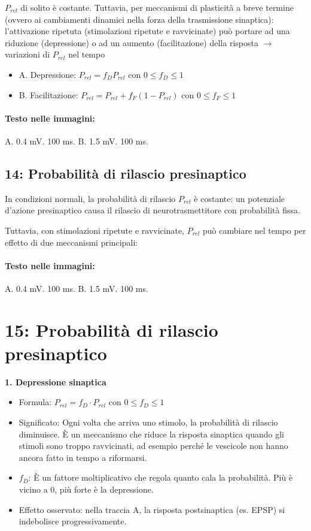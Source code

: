 $P_{rel}$ di solito è costante. Tuttavia, per meccanismi di plasticità a breve termine (ovvero ai cambiamenti dinamici nella forza della trasmissione sinaptica): l'attivazione ripetuta (stimolazioni ripetute e ravvicinate) può portare ad una riduzione (depressione) o ad un aumento (facilitazione) della risposta $\rightarrow$ variazioni di $P_{rel}$ nel tempo

\begin{itemize}
    \item A. Depressione: $P_{rel} = f_{D} P_{rel}$ con $0 \le f_{D} \le 1$
    \item B. Facilitazione: $P_{rel} = P_{rel} + f_{F}(1 - P_{rel})$ con $0 \le f_{F} \le 1$
\end{itemize}

\paragraph*{Testo nelle immagini:}
A. 0.4 mV. 100 ms. B. 1.5 mV. 100 ms.


\subsection*{ 14: Probabilità di rilascio presinaptico}

In condizioni normali, la probabilità di rilascio $P_{rel}$ è costante: un potenziale d'azione presinaptico causa il rilascio di neurotrasmettitore con probabilità fissa.

Tuttavia, con stimolazioni ripetute e ravvicinate, $P_{rel}$ può cambiare nel tempo per effetto di due meccanismi principali:

\paragraph*{Testo nelle immagini:}
A. 0.4 mV. 100 ms. B. 1.5 mV. 100 ms.


\section*{ 15: Probabilità di rilascio presinaptico}

\textbf{1. Depressione sinaptica}
\begin{itemize}
    \item Formula: $P_{rel} = f_{D} \cdot P_{rel}$ con $0 \le f_{D} \le 1$
    \item Significato: Ogni volta che arriva uno stimolo, la probabilità di rilascio diminuisce. È un meccanismo che riduce la risposta sinaptica quando gli stimoli sono troppo ravvicinati, ad esempio perché le vescicole non hanno ancora fatto in tempo a riformarsi.
    \item $f_{D}$: È un fattore moltiplicativo che regola quanto cala la probabilità. Più è vicino a 0, più forte è la depressione.
    \item Effetto osservato: nella traccia A, la risposta postsinaptica (es. EPSP) si indebolisce progressivamente.
\end{itemize}

